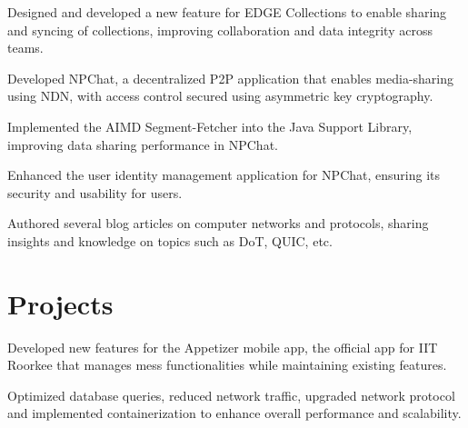 \documentclass[letterpaper]{deedy-resume} %
\begin{document}
\begin{minipage}[t]{0.66\textwidth}
\sectionspace %


\begin{tightitemize}
\item Designed and developed a new feature for EDGE Collections to enable sharing and syncing of collections, improving collaboration and data integrity across teams.
\end{tightitemize}

\sectionspace %

\begin{tightitemize}
\item Developed NPChat, a decentralized P2P application that enables media-sharing using NDN, with access control secured using asymmetric key cryptography.
\item Implemented the AIMD Segment-Fetcher into the Java Support Library, improving data sharing performance in NPChat.
\item Enhanced the user identity management application for NPChat, ensuring its security and usability for users.
\end{tightitemize}

\sectionspace %

Authored several blog articles on computer networks and protocols, sharing insights and knowledge on topics such as DoT, QUIC, etc.

\sectionspace %


\section{Projects} 

\begin{tightitemize}
\item Developed new features for the Appetizer mobile app, the official app for IIT Roorkee that manages mess functionalities while maintaining existing features.
\item Optimized database queries, reduced network traffic, upgraded network protocol and implemented containerization to enhance overall performance and scalability.
\end{tightitemize}
\sectionspace %


\end{minipage}
\end{document}
